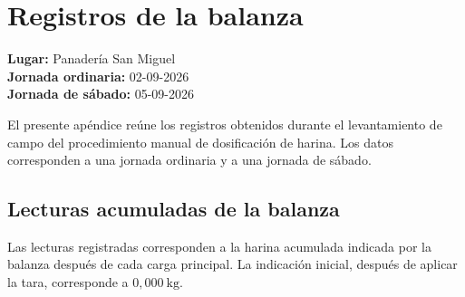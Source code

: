 
\chapter{Registros de la balanza}
\label{ap:registros_campo}

\normalsize

\noindent
\textbf{Lugar:} Panadería San Miguel\\
\textbf{Jornada ordinaria:} 02-09-2026\\
\textbf{Jornada de sábado:} 05-09-2026

\vspace{0.5cm}

El presente apéndice reúne los registros obtenidos durante el
levantamiento de campo del procedimiento manual de dosificación de harina.
Los datos corresponden a una jornada ordinaria y a una jornada de sábado.


\section{Lecturas acumuladas de la balanza}

Las lecturas registradas corresponden a la harina acumulada indicada por
la balanza después de cada carga principal. La indicación inicial, después
de aplicar la tara, corresponde a $0{,}000\ \mathrm{kg}$.

